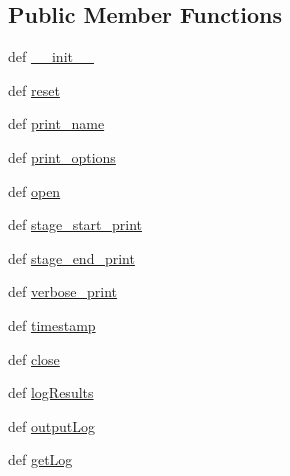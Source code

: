 \subsection*{Public Member Functions}
\begin{DoxyCompactItemize}
\item 
def \hyperlink{classLogger_1_1Logger_aff6a8050c4529cf59be26d70e487aba9}{\-\_\-\-\_\-init\-\_\-\-\_\-}
\item 
def \hyperlink{classLogger_1_1Logger_a13e2a87babf570a4524a9a0e505ba396}{reset}
\item 
def \hyperlink{classLogger_1_1Logger_a3ec2e17d92bb034c1e4f1e11ec7c2522}{print\-\_\-name}
\item 
def \hyperlink{classLogger_1_1Logger_aa6ca87386f752414ada5cc84daa1bfd4}{print\-\_\-options}
\item 
def \hyperlink{classLogger_1_1Logger_a009dfacca4ae352cc05a7e8307d8ecb5}{open}
\item 
def \hyperlink{classLogger_1_1Logger_a10165baedbbebdc49c449237e518edb8}{stage\-\_\-start\-\_\-print}
\item 
def \hyperlink{classLogger_1_1Logger_a2f203cbc01e4de98b5eab3e5c9d9709f}{stage\-\_\-end\-\_\-print}
\item 
def \hyperlink{classLogger_1_1Logger_a8c05e25fb36679fae21ab8910eb6d117}{verbose\-\_\-print}
\item 
def \hyperlink{classLogger_1_1Logger_abdeac14fe7d313f6a4d2788ec7652ce2}{timestamp}
\item 
def \hyperlink{classLogger_1_1Logger_a8ee3d433a755c789820bd9188824debc}{close}
\item 
def \hyperlink{classLogger_1_1Logger_a119a7a5e59e77d9cced01057bdd8d493}{log\-Results}
\item 
def \hyperlink{classLogger_1_1Logger_ac50b7479c5c0f15b94ae311774600cd7}{output\-Log}
\item 
def \hyperlink{classLogger_1_1Logger_af565e7da19e56f4f4ff0e1f88b172394}{get\-Log}
\end{DoxyCompactItemize}
